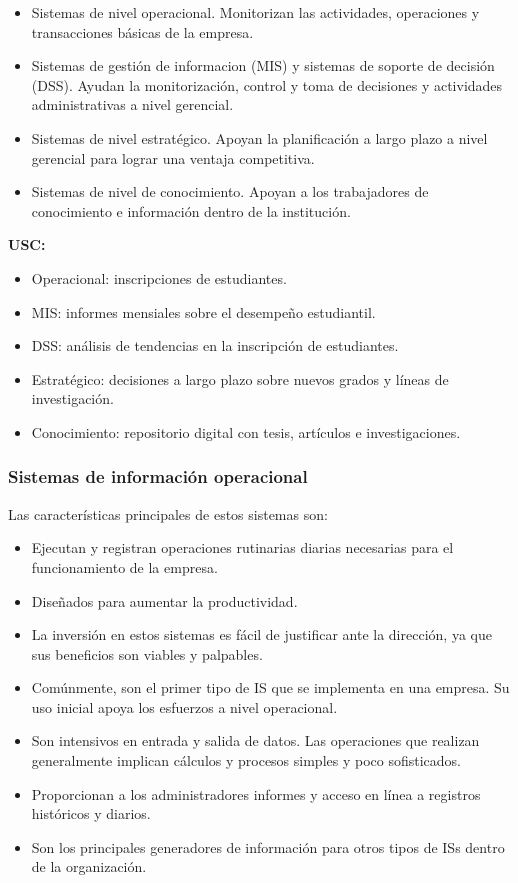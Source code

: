 \begin{itemize}
\item Sistemas de nivel operacional. Monitorizan las actividades, operaciones y transacciones básicas de la empresa. 
\item Sistemas de gestión de informacion (MIS) y sistemas de soporte de decisión (DSS). Ayudan la monitorización, control y toma de decisiones y actividades administrativas a nivel gerencial. 
\item Sistemas de nivel estratégico. Apoyan la planificación a largo plazo a nivel gerencial para lograr una ventaja competitiva.
\item Sistemas de nivel de conocimiento. Apoyan a los trabajadores de conocimiento e información dentro de la institución.
\end{itemize}

\begin{example}
\textbf{USC:}
\begin{itemize}
\item Operacional: inscripciones de estudiantes.
\item MIS: informes mensiales sobre el desempeño estudiantil.
\item DSS: análisis de tendencias en la inscripción de estudiantes.
\item Estratégico: decisiones a largo plazo sobre nuevos grados y líneas de investigación.
\item Conocimiento: repositorio digital con tesis, artículos e investigaciones.
\end{itemize}
\end{example}

\subsubsection{Sistemas de información operacional}

Las características principales de estos sistemas son:
\begin{itemize}
\item Ejecutan y registran operaciones rutinarias diarias necesarias para el funcionamiento de la empresa. 
\item Diseñados para aumentar la productividad.
\item La inversión en estos sistemas es fácil de justificar ante la dirección, ya que sus beneficios son viables y palpables. 
\item Comúnmente, son el primer tipo de IS que se implementa en una empresa. Su uso inicial apoya los esfuerzos a nivel operacional.
\item Son intensivos en entrada y salida de datos. Las operaciones que realizan generalmente implican cálculos y procesos simples y poco sofisticados. 
\item Proporcionan a los administradores informes y acceso en línea a registros históricos y diarios.
\item Son los principales generadores de información para otros tipos de ISs dentro de la organización.
\end{itemize}


